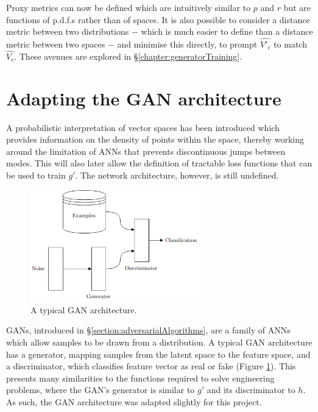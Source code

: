 \documentclass[../../main.tex]{subfiles}
\begin{document}
Proxy metrics can now be defined which are intuitively similar to $p$ and $r$ but are functions of p.d.f.s rather than of spaces.
It is also possible to consider a distance metric between two distributions $-$ which is much easier to define than a distance metric between two spaces $-$ and minimise this directly, to prompt $\hat{V'_c}$ to match $\hat{V_c}$.
These avenues are explored in \S\ref{chapter:generatorTraining}.

\section{Adapting the GAN architecture} \label{section:adaptingTheGANArchitecture}

A probabilistic interpretation of vector spaces has been introduced which provides information on the density of points within the space, thereby working around the limitation of ANNs that prevents discontinuous jumps between modes.
This will also later allow the definition of tractable loss functions that can be used to train $g'$.
The network architecture, however, is still undefined.
\begin{figure}[H]
    \begin{center}
    \includegraphics[width=0.65\textwidth]{ganArchitecture}
    \caption{
		A typical GAN architecture.
    }
    \label{fig:ganArchitecture}
    \end{center}
\end{figure}
GANs, introduced in \S\ref{section:adversarialAlgorithms}, are a family of ANNs which allow samples to be drawn from a distribution.
A typical GAN architecture has a generator, mapping samples from the latent space to the feature space, and a discriminator, which classifies feature vector as real or fake (Figure \ref{fig:ganArchitecture}).
This presents many similarities to the functions required to solve engineering problems, where the GAN's generator is similar to $g'$ and its discriminator to $h$.
As such, the GAN architecture was adapted slightly for this project.
\end{document}
